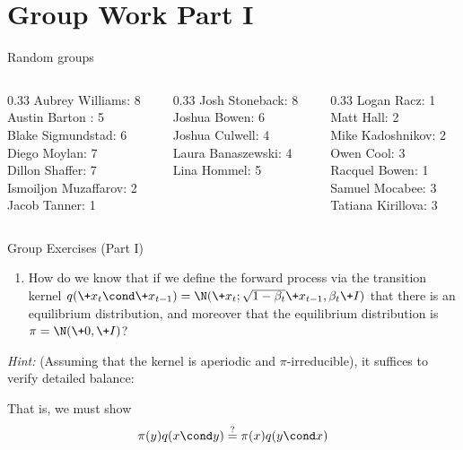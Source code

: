 \documentclass[10pt]{beamer}
\begin{document}
\section{Group Work Part I}

\begin{frame}{Random groups}
\begin{columns}
\begin{column}{0.33\textwidth}
Aubrey Williams: 8 \\ 
Austin Barton : 5 \\ 
Blake Sigmundstad: 6 \\ 
Diego Moylan: 7 \\ 
Dillon Shaffer: 7 \\ 
Ismoiljon Muzaffarov: 2 \\ 
Jacob Tanner: 1 \\\end{column}
\begin{column}{0.33\textwidth}
Josh Stoneback: 8 \\ 
Joshua Bowen: 6 \\ 
Joshua Culwell: 4 \\ 
Laura Banaszewski: 4 \\ 
Lina Hommel: 5 \\\end{column}
\begin{column}{0.33\textwidth}
Logan Racz: 1 \\ 
Matt Hall: 2 \\ 
Mike Kadoshnikov: 2 \\ 
Owen Cool: 3 \\ 
Racquel Bowen: 1 \\ 
Samuel Mocabee: 3 \\ 
Tatiana Kirillova: 3 \\\end{column}
\end{columns}	
\end{frame}



\begin{frame}{Group Exercises (Part I)}

\begin{enumerate}
	\item How do we know that if we define the forward process via the transition kernel $q(\+x_t \cond \+x_{t-1}) = \N(\+x_t; \sqrt{1-\beta_t} \+x_{t-1}, \beta_t \+I)$ that there is an equilibrium distribution, and moreover that the equilibrium distribution is $\pi = \N(\+0, \+I)$?
\end{enumerate} 

\vfill 
\pause 
\textit{Hint:} (Assuming that the kernel is aperiodic and $\pi$-irreducible), it suffices to verify detailed balance:

That is, we must show 
\[ \pi(y) q(x \cond y) \stackrel{?}{=} \pi(x) q(y \cond x) \] 

	
\end{frame}
\end{document}
